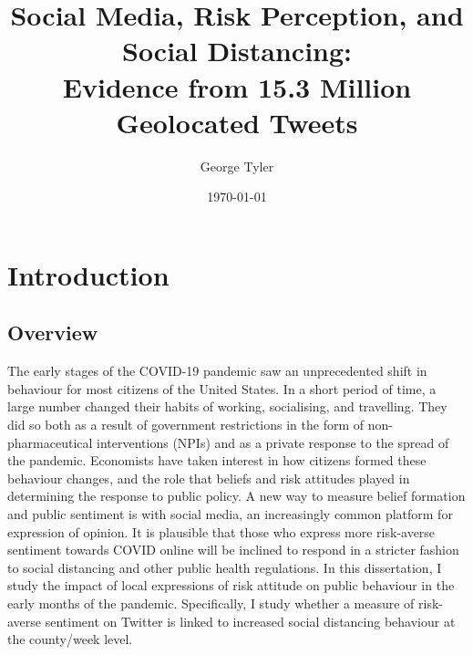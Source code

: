 \documentclass{article}
\author{George Tyler}
\date{\today}
\newcommand\wordcount{}
\begin{document}
\title{Social Media, Risk Perception, and Social Distancing: \\ Evidence from 15.3 Million Geolocated Tweets}

\maketitle

\wordcount

\tableofcontents

\section{Introduction}
\subsection{Overview}\label{overview}
The early stages of the COVID-19 pandemic saw an unprecedented shift in behaviour for most citizens of the United States. In a short period of time, a large number changed their habits of working, socialising, and travelling. They did so both as a result of government restrictions in the form of non-pharmaceutical interventions (NPIs) and as a private response to the spread of the pandemic. Economists have taken interest in how citizens formed these behaviour changes, and the role that beliefs and risk attitudes played in determining the response to public policy. A new way to measure belief formation and public sentiment is with social media, an increasingly common platform for expression of opinion. It is plausible that those who express more risk-averse sentiment towards COVID online will be inclined to respond in a stricter fashion to social distancing and other public health regulations. In this dissertation, I study the impact of local expressions of risk attitude on public behaviour in the early months of the pandemic. Specifically, I study whether a measure of risk-averse sentiment on Twitter is linked to increased social distancing behaviour at the county/week level. 
\end{document}
